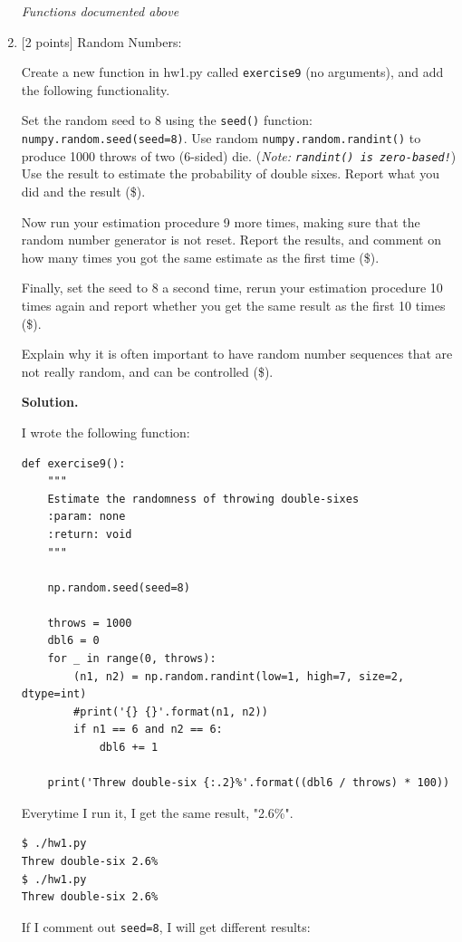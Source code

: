 \documentclass[10pt]{article}
\begin{document}
\begin{enumerate}
\emph{Functions documented above}

\item \label{prob:9} [2 points]
Random Numbers:

Create a new function in hw1.py called {\tt exercise9} (no arguments), and add the following functionality.

Set the random seed to 8 using the {\tt seed()} function: {\tt numpy.random.seed(seed=8)}.  Use random {\tt numpy.random.randint()} to produce 1000 throws of two (6-sided) die.  ({\em Note: {\tt randint() is zero-based!}})  Use the result to estimate the probability of double sixes.  Report what you did and the result (\$).  

Now run your estimation procedure 9 more times, making sure that the random number generator is not reset.  Report the results, and comment on how many times you got the same estimate as the first time (\$).

Finally, set the seed to 8 a second time, rerun your estimation procedure 10 times again and report whether you get the same result as the first 10 times (\$).

Explain why it is often important to have random number sequences that are not really random, and can be controlled (\$).

{\bf Solution.} 

I wrote the following function:

\begin{verbatim}
def exercise9():
    """
    Estimate the randomness of throwing double-sixes
    :param: none
    :return: void
    """

    np.random.seed(seed=8)

    throws = 1000
    dbl6 = 0
    for _ in range(0, throws):
        (n1, n2) = np.random.randint(low=1, high=7, size=2, dtype=int)
        #print('{} {}'.format(n1, n2))
        if n1 == 6 and n2 == 6:
            dbl6 += 1

    print('Threw double-six {:.2}%'.format((dbl6 / throws) * 100))
\end{verbatim}

Everytime I run it, I get the same result, "2.6\%".

\begin{verbatim}
$ ./hw1.py
Threw double-six 2.6%
$ ./hw1.py
Threw double-six 2.6%
\end{verbatim}

If I comment out {\tt seed=8}, I will get different results:


\end{enumerate}
\end{document}
